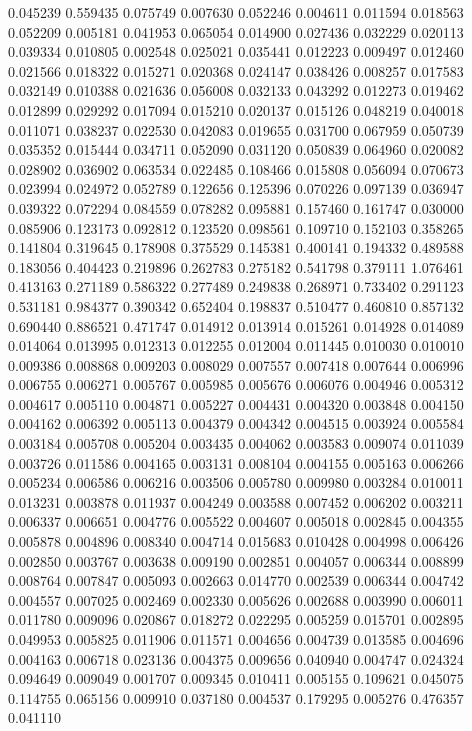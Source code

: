 0.045239
0.559435
0.075749
0.007630
0.052246
0.004611
0.011594
0.018563
0.052209
0.005181
0.041953
0.065054
0.014900
0.027436
0.032229
0.020113
0.039334
0.010805
0.002548
0.025021
0.035441
0.012223
0.009497
0.012460
0.021566
0.018322
0.015271
0.020368
0.024147
0.038426
0.008257
0.017583
0.032149
0.010388
0.021636
0.056008
0.032133
0.043292
0.012273
0.019462
0.012899
0.029292
0.017094
0.015210
0.020137
0.015126
0.048219
0.040018
0.011071
0.038237
0.022530
0.042083
0.019655
0.031700
0.067959
0.050739
0.035352
0.015444
0.034711
0.052090
0.031120
0.050839
0.064960
0.020082
0.028902
0.036902
0.063534
0.022485
0.108466
0.015808
0.056094
0.070673
0.023994
0.024972
0.052789
0.122656
0.125396
0.070226
0.097139
0.036947
0.039322
0.072294
0.084559
0.078282
0.095881
0.157460
0.161747
0.030000
0.085906
0.123173
0.092812
0.123520
0.098561
0.109710
0.152103
0.358265
0.141804
0.319645
0.178908
0.375529
0.145381
0.400141
0.194332
0.489588
0.183056
0.404423
0.219896
0.262783
0.275182
0.541798
0.379111
1.076461
0.413163
0.271189
0.586322
0.277489
0.249838
0.268971
0.733402
0.291123
0.531181
0.984377
0.390342
0.652404
0.198837
0.510477
0.460810
0.857132
0.690440
0.886521
0.471747
0.014912
0.013914
0.015261
0.014928
0.014089
0.014064
0.013995
0.012313
0.012255
0.012004
0.011445
0.010030
0.010010
0.009386
0.008868
0.009203
0.008029
0.007557
0.007418
0.007644
0.006996
0.006755
0.006271
0.005767
0.005985
0.005676
0.006076
0.004946
0.005312
0.004617
0.005110
0.004871
0.005227
0.004431
0.004320
0.003848
0.004150
0.004162
0.006392
0.005113
0.004379
0.004342
0.004515
0.003924
0.005584
0.003184
0.005708
0.005204
0.003435
0.004062
0.003583
0.009074
0.011039
0.003726
0.011586
0.004165
0.003131
0.008104
0.004155
0.005163
0.006266
0.005234
0.006586
0.006216
0.003506
0.005780
0.009980
0.003284
0.010011
0.013231
0.003878
0.011937
0.004249
0.003588
0.007452
0.006202
0.003211
0.006337
0.006651
0.004776
0.005522
0.004607
0.005018
0.002845
0.004355
0.005878
0.004896
0.008340
0.004714
0.015683
0.010428
0.004998
0.006426
0.002850
0.003767
0.003638
0.009190
0.002851
0.004057
0.006344
0.008899
0.008764
0.007847
0.005093
0.002663
0.014770
0.002539
0.006344
0.004742
0.004557
0.007025
0.002469
0.002330
0.005626
0.002688
0.003990
0.006011
0.011780
0.009096
0.020867
0.018272
0.022295
0.005259
0.015701
0.002895
0.049953
0.005825
0.011906
0.011571
0.004656
0.004739
0.013585
0.004696
0.004163
0.006718
0.023136
0.004375
0.009656
0.040940
0.004747
0.024324
0.094649
0.009049
0.001707
0.009345
0.010411
0.005155
0.109621
0.045075
0.114755
0.065156
0.009910
0.037180
0.004537
0.179295
0.005276
0.476357
0.041110
